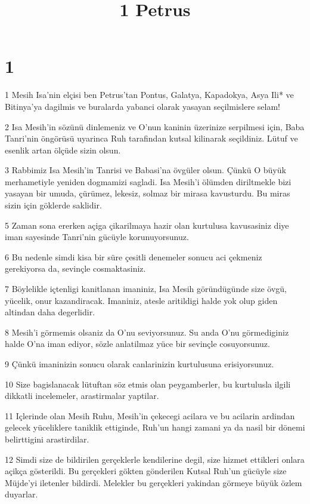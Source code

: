

\title{1 Petrus}


\chapter{1}

\par 1 Mesih Isa'nin elçisi ben Petrus'tan Pontus, Galatya, Kapadokya, Asya Ili* ve Bitinya'ya dagilmis ve buralarda yabanci olarak yasayan seçilmislere selam!
\par 2 Isa Mesih'in sözünü dinlemeniz ve O'nun kaninin üzerinize serpilmesi için, Baba Tanri'nin öngörüsü uyarinca Ruh tarafindan kutsal kilinarak seçildiniz. Lütuf ve esenlik artan ölçüde sizin olsun.
\par 3 Rabbimiz Isa Mesih'in Tanrisi ve Babasi'na övgüler olsun. Çünkü O büyük merhametiyle yeniden dogmamizi sagladi. Isa Mesih'i ölümden diriltmekle bizi yasayan bir umuda, çürümez, lekesiz, solmaz bir mirasa kavusturdu. Bu miras sizin için göklerde saklidir.
\par 5 Zaman sona ererken açiga çikarilmaya hazir olan kurtulusa kavusasiniz diye iman sayesinde Tanri'nin gücüyle korunuyorsunuz.
\par 6 Bu nedenle simdi kisa bir süre çesitli denemeler sonucu aci çekmeniz gerekiyorsa da, sevinçle cosmaktasiniz.
\par 7 Böylelikle içtenligi kanitlanan imaniniz, Isa Mesih göründügünde size övgü, yücelik, onur kazandiracak. Imaniniz, atesle aritildigi halde yok olup giden altindan daha degerlidir.
\par 8 Mesih'i görmemis olsaniz da O'nu seviyorsunuz. Su anda O'nu görmediginiz halde O'na iman ediyor, sözle anlatilmaz yüce bir sevinçle cosuyorsunuz.
\par 9 Çünkü imaninizin sonucu olarak canlarinizin kurtulusuna erisiyorsunuz.
\par 10 Size bagislanacak lütuftan söz etmis olan peygamberler, bu kurtulusla ilgili dikkatli incelemeler, arastirmalar yaptilar.
\par 11 Içlerinde olan Mesih Ruhu, Mesih'in çekecegi acilara ve bu acilarin ardindan gelecek yüceliklere taniklik ettiginde, Ruh'un hangi zamani ya da nasil bir dönemi belirttigini arastirdilar.
\par 12 Simdi size de bildirilen gerçeklerle kendilerine degil, size hizmet ettikleri onlara açikça gösterildi. Bu gerçekleri gökten gönderilen Kutsal Ruh'un gücüyle size Müjde'yi iletenler bildirdi. Melekler bu gerçekleri yakindan görmeye büyük özlem duyarlar.
